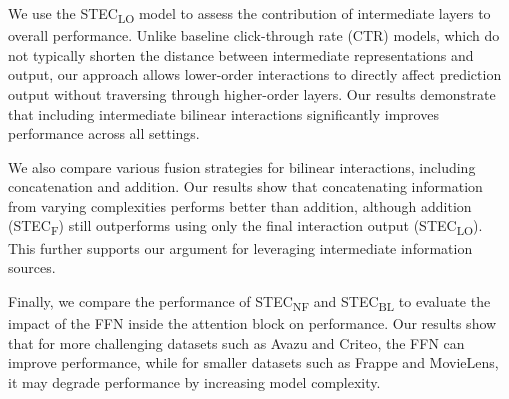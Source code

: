 \documentclass{article}
\begin{document}
\begin{table}[t]
\centering
\caption{Ablation studies on Avazu, Criteo, Frappe and MovieLens datasets in terms of AUC metric.}
\label{table:ablation}
\end{table}

We use the STEC\textsubscript{LO} model to assess  the contribution of intermediate layers to overall performance. Unlike baseline click-through rate (CTR) models, which do not typically shorten the distance between intermediate representations and output, our approach allows lower-order interactions to directly affect prediction output without traversing through higher-order layers. Our results demonstrate that including intermediate bilinear interactions significantly improves performance across all settings.

We also compare various fusion strategies for bilinear interactions, including concatenation and addition. Our results show that concatenating information from varying complexities performs better than addition, although addition (STEC\textsubscript{F}) still outperforms using only the final interaction output (STEC\textsubscript{LO}). This further supports our argument for leveraging intermediate information sources.

Finally, we compare the performance of STEC\textsubscript{NF} and STEC\textsubscript{BL} to evaluate the impact of the FFN inside the attention block on performance. Our results show that for more challenging datasets such as Avazu and Criteo, the FFN can improve performance, while for smaller datasets such as Frappe and MovieLens, it may degrade performance by increasing model complexity.
\end{document}
